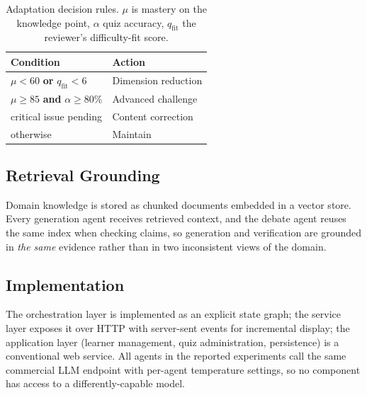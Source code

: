 \begin{table}[!t]
\centering
\caption{Adaptation decision rules. $\mu$ is mastery on the knowledge point,
$\alpha$ quiz accuracy, $q_{\text{fit}}$ the reviewer's difficulty-fit score.}
\label{tab:adapt}
\begin{tabular}{@{}ll@{}}
\toprule
\textbf{Condition} & \textbf{Action} \\
\midrule
$\mu < 60$ \textbf{or} $q_{\text{fit}} < 6$ & Dimension reduction \\
$\mu \ge 85$ \textbf{and} $\alpha \ge 80\%$ & Advanced challenge \\
critical issue pending & Content correction \\
otherwise & Maintain \\
\bottomrule
\end{tabular}
\end{table}

\subsection{Retrieval Grounding}

Domain knowledge is stored as chunked documents embedded in a vector store.
Every generation agent receives retrieved context, and the debate agent reuses
the same index when checking claims, so generation and verification are
grounded in \emph{the same} evidence rather than in two inconsistent views of
the domain.

\subsection{Implementation}

The orchestration layer is implemented as an explicit state graph; the service
layer exposes it over HTTP with server-sent events for incremental display; the
application layer (learner management, quiz administration, persistence) is a
conventional web service. All agents in the reported experiments call the same
commercial LLM endpoint with per-agent temperature settings, so no component
has access to a differently-capable model.
